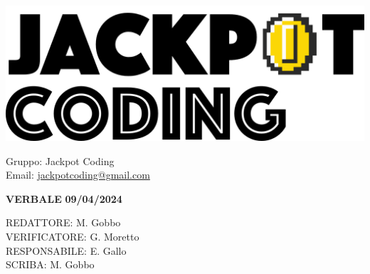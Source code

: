 \documentclass[5pt]{article}
\begin{document}
\begin{minipage}[t]{0.50\textwidth}
    \begin{flushleft}
        \hspace{10pt}
        \includegraphics[scale=0.65]{jackpot-logo.png} 
    \end{flushleft}
\end{minipage}
\hspace{-60pt} %
\begin{flushright}
    \begin{minipage}[t]{0.50\textwidth}
        \begin{flushright}
            Gruppo: {\Large Jackpot Coding}\\
            Email: \href{mailto:jackpotcoding@gmail.com}{jackpotcoding@gmail.com}
        \end{flushright}
    \end{minipage}
\end{flushright}

\vspace{24pt}

\begin{center}
    \textbf{\large VERBALE }
    \textbf{\large 09/04/2024} \\
\end{center}

\vspace{13pt}

\begin{flushleft}
    \begin{spacing}{1.5}
        REDATTORE:  M. Gobbo\\%
        VERIFICATORE:   G. Moretto\\%
        RESPONSABILE:  E. Gallo \\%
        \vspace{7pt}
        SCRIBA: M. Gobbo\\%
        \vspace{7pt}
    \end{spacing}
\end{flushleft}
\end{document}
